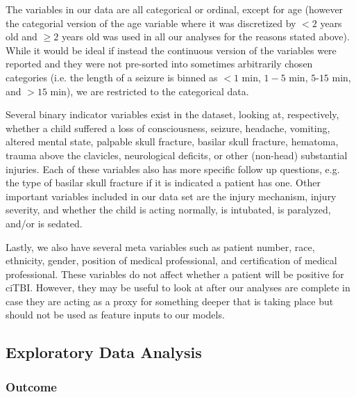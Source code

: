 \documentclass[11pt, letterpaper]{amsart}
\let\Oldsubsection\subsection
\renewcommand{\subsection}{\FloatBarrier\Oldsubsection}
\let\Oldsubsubsection\subsubsection
\renewcommand{\subsubsection}{\FloatBarrier\Oldsubsubsection}
\begin{document}
The variables in our data are all categorical or ordinal, except for age (however the categorial version of the age variable where it was discretized by $< 2$ years old and $\geq 2$ years old was used in all our analyses for the reasons stated above). While it would be ideal if instead the continuous version of the variables were reported and they were not pre-sorted into sometimes arbitrarily chosen categories (i.e. the length of a seizure is binned as  $< 1$ min, $1 - 5$ min, $5 ‐ 15$ min, and $> 15$ min), we are restricted to the categorical data. 

Several binary indicator variables exist in the dataset, looking at, respectively, whether a child suffered a loss of consciousness, seizure, headache, vomiting, altered mental state, palpable skull fracture, basilar skull fracture, hematoma, trauma above the clavicles, neurological deficits, or other (non-head) substantial injuries. Each of these variables also has more specific follow up questions, e.g. the type of basilar skull fracture if it is indicated a patient has one. Other important variables included in our data set are the injury mechanism, injury severity, and whether the child is acting normally, is intubated, is paralyzed, and/or is sedated.

Lastly, we also have several meta variables such as patient number, race, ethnicity, gender, position of medical professional, and certification of medical professional. These variables do not affect whether a patient will be positive for ciTBI. However, they may be useful to look at after our analyses are complete in case they are acting as a proxy for something deeper that is taking place but should not be used as feature inputs to our models.

\subsection{Exploratory Data Analysis} \label{ssec:eda}

\subsubsection{Outcome}
\end{document}
